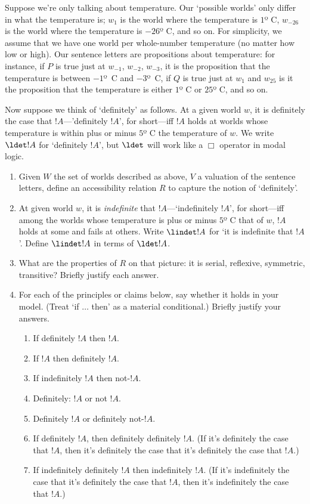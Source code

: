 \documentclass[../../../../include/open-logic-section]{subfiles}
\begin{document}
\begin{prob}
Suppose we're only talking about temperature. Our `possible worlds'
only differ in what the temperature is; $w_{1}$ is the world where
the temperature is $1$º C, $w_{-26}$ is the world where the temperature
is $-26$º C, and so on. For simplicity, we assume that we have one
world per whole-number temperature (no matter how low or high). Our
sentence letters are propositions about temperature: for instance,
if $P$ is true just at $w_{-1}$, $w_{-2}$, $w_{-3}$, it is the
proposition that the temperature is between $-1$º~C and $-3$º~C,
if $Q$ is true just at $w_{1}$ and $w_{25}$ is it the proposition
that the temperature is either $1$º C or $25$º C, and so on. 

Now suppose we think of `definitely' as follows. At a given world
$w$, it is definitely the case that $!A$---'definitely $!A$',
for short---iff $!A$ holds at worlds whose temperature is within plus
or minus $5$º C the temperature of $w$. We write $\ldet!A$
for `definitely $!A$', but $\ldet$ will work like a $\Box$
operator in modal logic. 

\begin{enumerate}
\item Given $W$ the set of worlds described as above, $V$ a valuation
of the sentence letters, define an accessibility relation $R$ to
capture the notion of `definitely'. 
\item At given world $w$, it is \emph{indefinite} that $!A$---`indefinitely
$!A$', for short---iff among the worlds whose temperature is plus
or minus $5$º C that of $w$, $!A$ holds at some and fails at
others. Write $\lindet!A$ for `it is indefinite that $!A$'.
Define $\lindet!A$ in terms of $\ldet!A$.
\item What are the properties of $R$ on that picture: it is serial, reflexive,
symmetric, transitive? Briefly justify each answer. 
\item For each of the principles or claims below, say whether it holds in
your model. (Treat `if $\ldots$ then' as a material conditional.)
Briefly justify your answers.
	\begin{enumerate}
		\item If definitely $!A$ then $!A$.
		\item If $!A$ then definitely $!A$.
		\item If indefinitely $!A$ then not-$!A$.
		\item Definitely: $!A$ or not $!A$.
		\item Definitely $!A$ or definitely not-$!A$.
		\item If definitely $!A$, then definitely definitely $!A$. (If it's
		definitely the case that $!A$, then it's definitely the case that
		it's definitely the case that $!A$.)
		\item If indefinitely definitely $!A$ then indefinitely $!A$. (If
		it's indefinitely the case that it's definitely the case that $!A$,
		then it's indefinitely the case that $!A$.)
	\end{enumerate}
\end{enumerate}



\end{prob}
\end{document}
